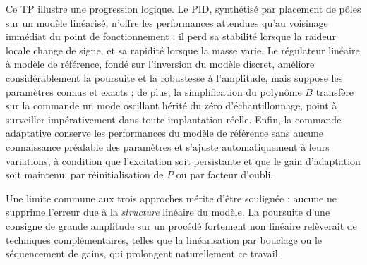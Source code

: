\documentclass[11pt,a4paper]{report}
\begin{document}
Ce TP illustre une progression logique. Le PID, synthétisé par placement de pôles sur un modèle
linéarisé, n'offre les performances attendues qu'au voisinage immédiat du point de
fonctionnement : il perd sa stabilité lorsque la raideur locale change de signe, et sa rapidité
lorsque la masse varie. Le régulateur linéaire à modèle de référence, fondé sur l'inversion du
modèle discret, améliore considérablement la poursuite et la robustesse à l'amplitude, mais
suppose les paramètres connus et exacts ; de plus, la simplification du polynôme $B$ transfère
sur la commande un mode oscillant hérité du zéro d'échantillonnage, point à surveiller
impérativement dans toute implantation réelle. Enfin, la commande adaptative conserve les
performances du modèle de référence sans aucune connaissance préalable des paramètres et
s'ajuste automatiquement à leurs variations, à condition que l'excitation soit persistante et
que le gain d'adaptation soit maintenu, par réinitialisation de $P$ ou par facteur d'oubli.

Une limite commune aux trois approches mérite d'être soulignée : aucune ne supprime l'erreur
due à la \emph{structure} linéaire du modèle. La poursuite d'une consigne de grande amplitude
sur un procédé fortement non linéaire relèverait de techniques complémentaires, telles que la
linéarisation par bouclage ou le séquencement de gains, qui prolongent naturellement ce travail.
\end{document}

